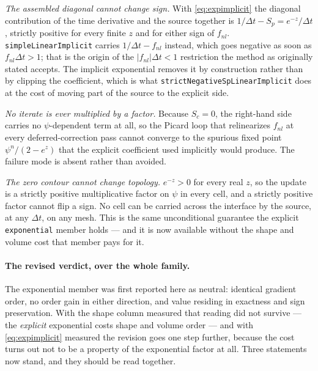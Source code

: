 \documentclass[preprint,3p,11pt]{elsarticle}
\newcommand{\psilev}{\psi}
\begin{document}
\emph{The assembled diagonal cannot change sign.} With
\eqref{eq:expimplicit} the diagonal contribution of the time derivative and the
source together is $1/\Delta t - S_p = e^{-z}/\Delta t$, strictly positive for
every finite $z$ and for either sign of $f_{nl}$.
\texttt{simpleLinearImplicit} carries $1/\Delta t - f_{nl}$ instead, which goes
negative as soon as $f_{nl}\Delta t > 1$; that is the origin of the
$|f_{nl}|\Delta t < 1$ restriction the method as originally stated accepts. The
implicit exponential removes it by construction rather than by clipping the
coefficient, which is what \texttt{strictNegativeSpLinearImplicit} does at the
cost of moving part of the source to the explicit side.

\emph{No iterate is ever multiplied by a factor.} Because $S_c = 0$, the
right-hand side carries no $\psilev$-dependent term at all, so the Picard loop
that relinearizes $f_{nl}$ at every deferred-correction pass cannot converge to the
spurious fixed point
$\psilev^{n}/(2-e^{z})$ that the explicit coefficient used implicitly would
produce. The failure mode is absent rather than avoided.

\emph{The zero contour cannot change topology.} $e^{-z} > 0$ for every real $z$,
so the update is a strictly positive multiplicative factor on $\psilev$ in every
cell, and a strictly positive factor cannot flip a sign. No cell can be carried
across the interface by the source, at any $\Delta t$, on any mesh. This is the
same unconditional guarantee the explicit \texttt{exponential} member holds ---
and it is now available without the shape and volume cost that member pays for it.

\paragraph{The revised verdict, over the whole family.} The exponential member was
first reported here as neutral: identical gradient order, no order gain in either
direction, and value residing in exactness and sign preservation. With the shape
column measured that reading did not survive --- the \emph{explicit} exponential
costs shape and volume order --- and with \eqref{eq:expimplicit} measured the
revision goes one step further, because the cost turns out not to be a property of
the exponential factor at all. Three statements now stand, and they should be read
together.
\end{document}
